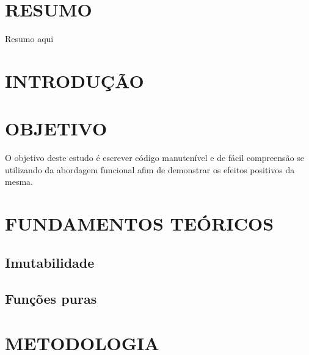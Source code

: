 \documentclass[date,twocolumn,a4paper]{ppgem}
\begin{document}
    \thispagestyle{plain}
    \makeheader




    \section*{RESUMO}
    Resumo aqui

    \section{INTRODUÇÃO}


    \section{OBJETIVO}
    O objetivo deste estudo é escrever código manutenível e de fácil compreensão se utilizando da abordagem funcional
    afim de demonstrar os efeitos positivos da mesma.

    \section{FUNDAMENTOS TEÓRICOS}
    \subsection{Imutabilidade}
    \subsection{Funções puras}

    \section{METODOLOGIA}
\end{document}
